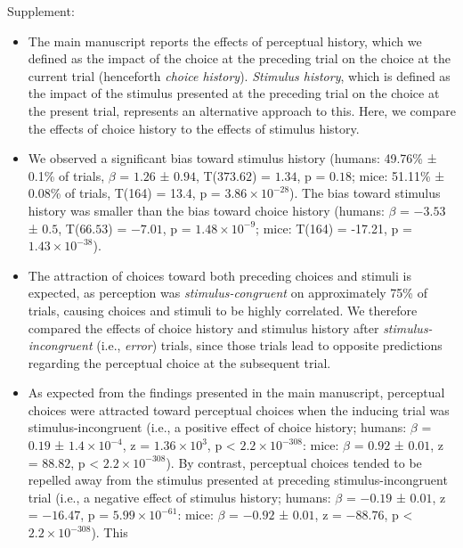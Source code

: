 \documentclass[
]{article}
\begin{document}
Supplement:

\begin{itemize}
\item
  The main manuscript reports the effects of perceptual history, which
  we defined as the impact of the choice at the preceding trial on the
  choice at the current trial (henceforth \emph{choice history}).
  \emph{Stimulus history}, which is defined as the impact of the
  stimulus presented at the preceding trial on the choice at the present
  trial, represents an alternative approach to this. Here, we compare
  the effects of choice history to the effects of stimulus history.
\item
  We observed a significant bias toward stimulus history (humans:
  49.76\% ± 0.1\% of trials, \(\beta\) = \(1.26\) ± \(0.94\),
  T(\(373.62\)) = \(1.34\), p = \(0.18\); mice: 51.11\% ± 0.08\% of
  trials, T(164) = 13.4, p = \(\ensuremath{3.86\times 10^{-28}}\)). The
  bias toward stimulus history was smaller than the bias toward choice
  history (humans: \(\beta\) = \(-3.53\) ± \(0.5\), T(\(66.53\)) =
  \(-7.01\), p = \(\ensuremath{1.48\times 10^{-9}}\); mice: T(164) =
  -17.21, p = \(\ensuremath{1.43\times 10^{-38}}\)).
\item
  The attraction of choices toward both preceding choices and stimuli is
  expected, as perception was \emph{stimulus-congruent} on approximately
  75\% of trials, causing choices and stimuli to be highly correlated.
  We therefore compared the effects of choice history and stimulus
  history after \emph{stimulus-incongruent} (i.e., \emph{error}) trials,
  since those trials lead to opposite predictions regarding the
  perceptual choice at the subsequent trial.
\item
  As expected from the findings presented in the main manuscript,
  perceptual choices were attracted toward perceptual choices when the
  inducing trial was stimulus-incongruent (i.e., a positive effect of
  choice history; humans: \(\beta\) = \(0.19\) ±
  \(\ensuremath{1.4\times 10^{-4}}\), z =
  \(\ensuremath{1.36\times 10^{3}}\), p < \(\ensuremath{2.2\times 10^{-308}}\): mice: \(\beta\) =
  \(0.92\) ± \(0.01\), z = \(88.82\), p < \(\ensuremath{2.2\times 10^{-308}}\)). By contrast,
  perceptual choices tended to be repelled away from the stimulus
  presented at preceding stimulus-incongruent trial (i.e., a negative
  effect of stimulus history; humans: \(\beta\) = \(-0.19\) ± \(0.01\),
  z = \(-16.47\), p = \(\ensuremath{5.99\times 10^{-61}}\): mice:
  \(\beta\) = \(-0.92\) ± \(0.01\), z = \(-88.76\), p < \(\ensuremath{2.2\times 10^{-308}}\)). This

\end{itemize}
\end{document}
